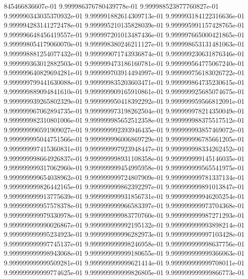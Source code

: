 845466836607e-01	9.999986376780439778e-01	9.999988523877760827e-01	9.999990343035370932e-01	9.999991882614309713e-01	9.999993184122316636e-01	9.999994283141272478e-01	9.999995210135828039e-01	9.999995991157428765e-01	9.999996648456419557e-01	9.999997201013487436e-01	9.999997665000421865e-01	9.999998054179060070e-01	9.999998380246211127e-01	9.999998653131481063e-01	9.999998881254077432e-01	9.999999071743936874e-01	9.999999230631876346e-01	9.999999363012882503e-01	9.999999473186160781e-01	9.999999564775067240e-01	9.999999640829694281e-01	9.999999703914494997e-01	9.999999756183026722e-01	9.999999799441630088e-01	9.999999835203603471e-01	9.999999864735230615e-01	9.999999889094841610e-01	9.999999909165910861e-01	9.999999925685074675e-01	9.999999939265802329e-01	9.999999950418392292e-01	9.999999959566812091e-01	9.999999967062894735e-01	9.999999973198262504e-01	9.999999978214350049e-01	9.999999982310801006e-01	9.999999985652512358e-01	9.999999988375517512e-01	9.999999990591909027e-01	9.999999992393946435e-01	9.999999993857469072e-01	9.999999995044751566e-01	9.999999996006869729e-01	9.999999996785661205e-01	9.999999997415360831e-01	9.999999997923948447e-01	9.999999998334262452e-01	9.999999998664926837e-01	9.999999998931108358e-01	9.999999999145146035e-01	9.999999999317062960e-01	9.999999999454995958e-01	9.999999999565541975e-01	9.999999999654038962e-01	9.999999999724807909e-01	9.999999999781337134e-01	9.999999999826442165e-01	9.999999999862392297e-01	9.999999999891013847e-01	9.999999999913775639e-01	9.999999999931856731e-01	9.999999999946205254e-01	9.999999999957578378e-01	9.999999999966583397e-01	9.999999999973704368e-01	9.999999999979330978e-01	9.999999999983770760e-01	9.999999999987271293e-01	9.999999999990026867e-01	9.999999999992195132e-01	9.999999999993898214e-01	9.999999999995234923e-01	9.999999999996282973e-01	9.999999999997103428e-01	9.999999999997745137e-01	9.999999999998246958e-01	9.999999999998637756e-01	9.999999999998943068e-01	9.999999999999180655e-01	9.999999999999366063e-01	9.999999999999509281e-01	9.999999999999621414e-01	9.999999999999708011e-01	9.999999999999774625e-01	9.999999999999826805e-01	9.999999999999866773e-01
